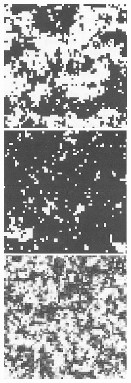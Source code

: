 \documentclass[
  letterpaper,
  enabledeprecatedfontcommands]{report}
\begin{document}
\begin{figure}

\begin{minipage}{0.50\linewidth}

\includegraphics[width=0.5\linewidth,height=\textheight,keepaspectratio]{phase-transitions/Figs/a1_2state.png}

\end{minipage}%
%
\begin{minipage}{0.50\linewidth}

\includegraphics[width=0.5\linewidth,height=\textheight,keepaspectratio]{phase-transitions/Figs/b1_2state.png}

\end{minipage}%
\newline
\begin{minipage}{0.50\linewidth}

\includegraphics[width=0.5\linewidth,height=\textheight,keepaspectratio]{phase-transitions/Figs/a2_2state.png}


\end{minipage}
\end{figure}
\end{document}
